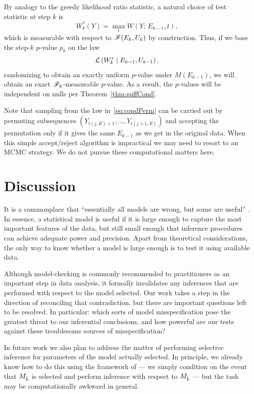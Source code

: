 \documentclass{article}
\begin{document}
By analogy to the greedy likelihood ratio statistic, a natural choice of test statistic at step $k$ is
\[
W_k^*(Y) = \max_t W(Y; \, E_{k-1}, t),
\]
which is measurable with respect to $\mathscr{F}(E_k, U_k)$ by construction. Thus, if we base the step-$k$ $p$-value $p_k$ on the law
\begin{equation}\label{eq:condPerm}
\mathcal{L}\left(W_k^* \mid E_{k-1}, U_{k-1}\right),
\end{equation}
randomizing to obtain an exactly uniform $p$-value under $M(E_{k-1})$, we will obtain an exact $\mathscr{F}_k$-measurable $p$-value. As a result, the $p$-values will be independent on nulls per Theorem~\ref{thm:suffCond}.

Note that sampling from the law in~\eqref{eq:condPerm} can be carried out by permuting subsequences $(Y_{t(j,E)+1}, \ldots, Y_{t(j+1,E)})$ and accepting the permutation only if it gives the same $E_{k-1}$ as we get in the original data. When this simple accept/reject algorithm is impractical we may need to resort to an MCMC strategy. We do not pursue these computational matters here.

\section{Discussion}
\label{sec:discussion}

It is a commonplace that ``essentially all models are wrong, but some are useful'' \citep{box1987empirical}. In essence, a statistical model is useful if it is large enough to capture the most important features of the data, but still small enough that inference procedures can achieve adequate power and precision. Apart from theoretical considerations, the only way to know whether a model is large enough is to test it using available data.

Although model-checking is commonly recommended to practitioners as an important step in data analysis, it formally invalidates any inferences that are performed with respect to the model selected. Our work takes a step in the direction of reconciling that contradiction, but there are important questions left to be resolved. In particular: which sorts of model misspecification pose the greatest threat to our inferential conclusions, and how powerful are our tests against these troublesome sources of misspecification? 

In future work we also plan to address the matter of performing selective inference for parameters of the model actually selected. In principle, we already know how to do this using the framework of \citet{fithian2014optimal} --- we simply condition on the event that $M_{\hat{k}}$ is selected and perform inference with respect to $M_{\hat{k}}$ --- but the task may be computationally awkward in general.
\end{document}
